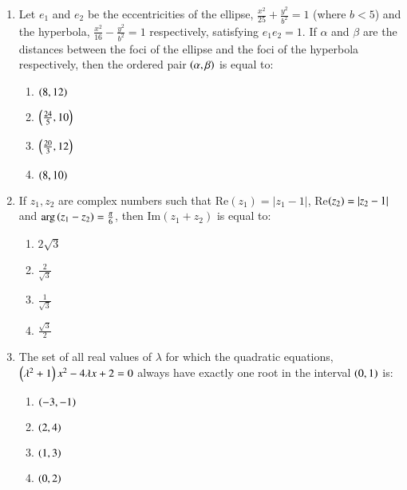 \documentclass[journal,9pt,twocolumn]{IEEEtran}
\begin{document}
\begin{enumerate}
\item  Let $e_1$ and $e_2$ be the eccentricities of the ellipse, $\frac{x^2}{25} + \frac{y^2}{b^2} = 1$ (where $b < 5$) and the hyperbola, $\frac{x^2}{16} - \frac{y^2}{b^2} = 1$ respectively, satisfying $e_1 e_2 = 1$. If $\alpha$ and $\beta$ are the distances between the foci of the ellipse and the foci of the hyperbola respectively, then the ordered pair $\left(\alpha, \beta\right)$ is equal to:
        \begin{multicols}{2}

\begin{enumerate}
    \item $\left(8, 12\right)$
    \item $\left(\frac{24}{5}, 10\right)$
    \item $\left(\frac{20}{3}, 12\right)$
    \item $\left(8, 10\right)$
\end{enumerate}
\end{multicols}

\item If $z_1, z_2$ are complex numbers such that Re$(z_1) = |z_1 - 1|$, Re$(z_2) = \left\vert z_2 - 1\right\vert$ and $\arg\left(z_1 - z_2\right) = \frac{\pi}{6}$, then Im$(z_1 + z_2)$ is equal to:
        \begin{multicols}{4}

\begin{enumerate}
    \item $2\sqrt{3}$
    \item $\frac{2}{\sqrt{3}}$
    \item $\frac{1}{\sqrt{3}}$
    \item $\frac{\sqrt{3}}{2}$
\end{enumerate}
\end{multicols}

\item The set of all real values of $\lambda$ for which the quadratic equations, $\left(\lambda^2 + 1\right)x^2 - 4\lambda x + 2 = 0$ always have exactly one root in the interval $\left(0, 1\right)$ is:
        
        \begin{multicols}{2}
\begin{enumerate}
    \item $\left(-3, -1\right)$
    \item $\left(2, 4\right)$
    \item $\left(1, 3\right)$
    \item $\left(0, 2\right)$
\end{enumerate}
\end{multicols}


\end{enumerate}
\end{document}
